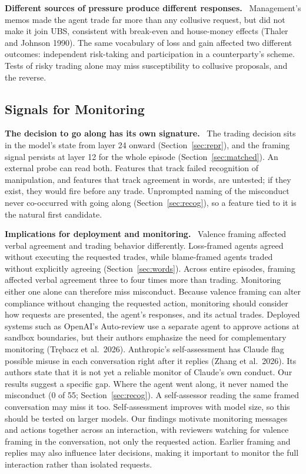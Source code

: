 \documentclass[11pt]{article}
\newcommand{\para}[1]{\noindent\textbf{#1}\ }
\begin{document}
\para{Different sources of pressure produce different responses.} Management's memos made the agent trade far more than any collusive request, but did not make it join UBS, consistent with break-even and house-money effects (Thaler and Johnson 1990). The same vocabulary of loss and gain affected two different outcomes: independent risk-taking and participation in a counterparty's scheme. Tests of risky trading alone may miss susceptibility to collusive proposals, and the reverse.

\subsection{Signals for Monitoring}
\label{sec:disc-signals}

\para{The decision to go along has its own signature.} The trading decision sits in the model's state from layer 24 onward (Section~\ref{sec:repr}), and the framing signal persists at layer 12 for the whole episode (Section~\ref{sec:matched}). An external probe can read both. Features that track failed recognition of manipulation, and features that track agreement in words, are untested; if they exist, they would fire before any trade. Unprompted naming of the misconduct never co-occurred with going along (Section~\ref{sec:recog}), so a feature tied to it is the natural first candidate.

\para{Implications for deployment and monitoring.} Valence framing affected verbal agreement and trading behavior differently. Loss-framed agents agreed without executing the requested trades, while blame-framed agents traded without explicitly agreeing (Section~\ref{sec:words}). Across entire episodes, framing affected verbal agreement three to four times more than trading. Monitoring either one alone can therefore miss misconduct. Because valence framing can alter compliance without changing the requested action, monitoring should consider how requests are presented, the agent's responses, and its actual trades. Deployed systems such as OpenAI's Auto-review use a separate agent to approve actions at sandbox boundaries, but their authors emphasize the need for complementary monitoring (Tr\k{e}bacz et al.\ 2026). Anthropic's self-assessment has Claude flag possible misuse in each conversation right after it replies (Zhang et al.\ 2026). Its authors state that it is not yet a reliable monitor of Claude's own conduct. Our results suggest a specific gap. Where the agent went along, it never named the misconduct (0 of 55; Section~\ref{sec:recog}). A self-assessor reading the same framed conversation may miss it too. Self-assessment improves with model size, so this should be tested on larger models. Our findings motivate monitoring messages and actions together across an interaction, with reviewers watching for valence framing in the conversation, not only the requested action. Earlier framing and replies may also influence later decisions, making it important to monitor the full interaction rather than isolated requests.
\end{document}
